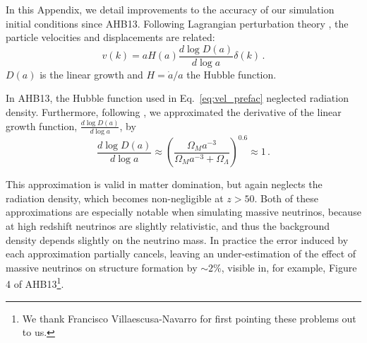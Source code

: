 \documentclass[useAMS, usenatbib]{mnras}
\begin{document}

In this Appendix, we detail improvements to the accuracy of our simulation initial conditions since AHB13.
Following Lagrangian perturbation theory \citep{Zeldovich_1970, Scoccimarro_1998},
the particle velocities and displacements are related:
\begin{equation}
v(k) = a H(a) \frac{d \log D(a)}{d \log a} \delta(k)\,.
\label{eq:vel_prefac}
\end{equation}
$D(a)$ is the linear growth and $H = \dot{a}/a$ the Hubble function.

In AHB13, the Hubble function used in Eq.~\eqref{eq:vel_prefac}
neglected radiation density. Furthermore, following \cite{Bouchet:1995}, we
approximated the derivative of the linear growth function, $\frac{d \log D(a)}{d \log a}$, by
\begin{equation}
\frac{d \log D(a)}{d \log a} \approx \left(\frac{\Omega_M a^{-3}}{\Omega_M  a^{-3} + \Omega_\Lambda}\right)^{0.6} \approx 1\,.
\end{equation}

This approximation is valid in matter domination, but again neglects the radiation density,
which becomes non-negligible at $z > 50$. Both of these approximations are especially notable
when simulating massive neutrinos, because at high redshift neutrinos are slightly relativistic,
and thus the background density depends slightly on the neutrino mass. In practice the error
induced by each approximation partially cancels, leaving an under-estimation of the effect of
massive neutrinos on structure formation by $\sim 2 \%$, visible in, for example,
Figure 4 of AHB13\footnote{We thank Francisco Villaescusa-Navarro for first pointing these problems out to us.}.
\end{document}

